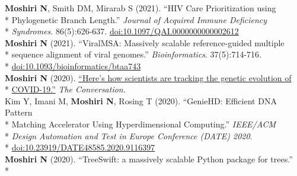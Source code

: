 \documentclass[margin,line]{res}
\begin{document}
\begin{resume}
\hspace*{4mm} \textbf{Moshiri N}, Smith DM, Mirarab S (2021). ``HIV Care Prioritization using\\*
\hspace*{9.5mm} Phylogenetic Branch Length.'' \textit{Journal of Acquired Immune Deficiency}\\*\vspace{2mm}
\hspace*{8mm} \textit{Syndromes}. 86(5):626-637. \href{https://doi.org/10.1097/QAI.0000000000002612}{doi:10.1097/QAI.0000000000002612}\\
\hspace*{4mm} \textbf{Moshiri N} (2021). ``ViralMSA: Massively scalable reference-guided multiple\\*
\hspace*{9.5mm} sequence alignment of viral genomes.'' \textit{Bioinformatics}. 37(5):714-716.\\*\vspace{2mm}
\hspace*{8mm} \href{https://doi.org/10.1093/bioinformatics/btaa743}{doi:10.1093/bioinformatics/btaa743}\\
\hspace*{4mm} \textbf{Moshiri N} (2020). \href{https://theconversation.com/heres-how-scientists-are-tracking-the-genetic-evolution-of-covid-19-134201}{``Here's how scientists are tracking the genetic evolution of}\\*\vspace{2mm}
\hspace*{8mm} \href{https://theconversation.com/heres-how-scientists-are-tracking-the-genetic-evolution-of-covid-19-134201}{COVID-19.''} \textit{The Conversation}.\\
\hspace*{4mm} Kim Y, Imani M, \textbf{Moshiri N}, Rosing T (2020). ``GenieHD: Efficient DNA Pattern\\*
\hspace*{9.5mm}  Matching Accelerator Using Hyperdimensional Computing.'' \textit{IEEE/ACM}\\*
\hspace*{9.5mm} \textit{Design Automation and Test in Europe Conference (DATE) 2020}.\\*\vspace{2mm}
\hspace*{8mm} \href{https://doi.org/10.23919/DATE48585.2020.9116397}{doi:10.23919/DATE48585.2020.9116397}\\
\hspace*{4mm} \textbf{Moshiri N} (2020). ``TreeSwift: a massively scalable Python package for trees.''\\*\vspace{2mm}

\end{resume}
\end{document}
